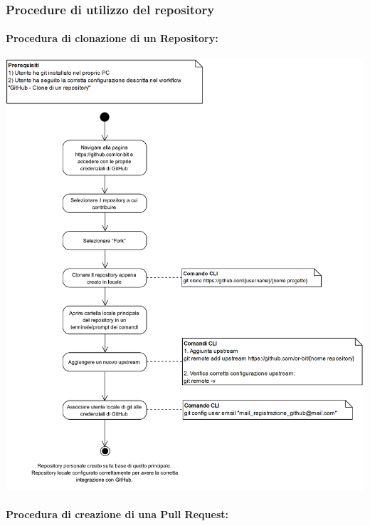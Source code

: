 \newpage
\subsubsection{Procedure di utilizzo del repository}

\paragraph{Procedura di clonazione di un Repository:}

\begin{center}
\includegraphics[width=15cm]{../../documenti/NormeDiProgetto/DiagrammiProcedure/GitHub-CloneDiUnRepository.png}
\end{center}

\paragraph{Procedura di creazione di una Pull Request:}


